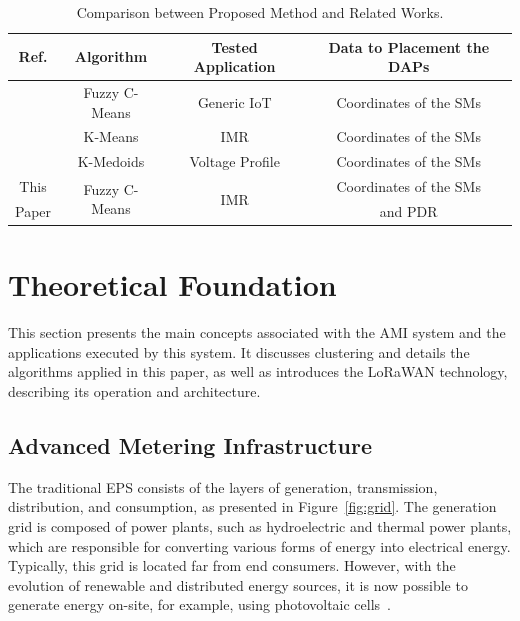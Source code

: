 \documentclass[a4paper,fleqn]{cas-dc}
\begin{document}
\begin{table}[ht]
    \centering
    \caption{Comparison between Proposed Method and Related Works.}
    \label{tab:tab_comparative}
    \begin{tabular}{cccc} \hline \hline  
                           Ref. & Algorithm & Tested Application & Data to Placement the \gls{DAPs} \\ \hline
    \cite{matni2020lorawan} & Fuzzy C-Means & Generic IoT & Coordinates of the \gls{SMs}\\
    \cite{piechowiak2023lorawan} & K-Means & IMR & Coordinates of the \gls{SMs}\\ 
    \cite{gallardo2021clustering} & K-Medoids & Voltage Profile & Coordinates of the \gls{SMs}\\
    This  & \multirow{2}{*}{Fuzzy C-Means} & \multirow{2}{*}{IMR} & Coordinates of the \gls{SMs}\\ 
    Paper & & & and PDR\\ \hline \hline
    \end{tabular}
\end{table}

\section{Theoretical Foundation} \label{sec:foundation}

This section presents the main concepts associated with the \gls{AMI} system and the applications executed by this system. It discusses clustering and details the algorithms applied in this paper, as well as introduces the \gls{LoRaWAN} technology, describing its operation and architecture.

\subsection{Advanced Metering Infrastructure} \label{sec:ami}

The traditional \gls{EPS} consists of the layers of generation, transmission, distribution, and consumption, as presented in Figure~\ref{fig:grid}. The generation grid is composed of power plants, such as hydroelectric and thermal power plants, which are responsible for converting various forms of energy into electrical energy. Typically, this grid is located far from end consumers. However, with the evolution of renewable and distributed energy sources, it is now possible to generate energy on-site, for example, using photovoltaic cells~\cite{voropai2020electric}.
\end{document}
